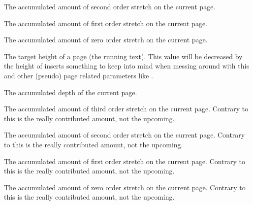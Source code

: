 The accumulated amount of second order stretch on the current page.

\stopoldprimitive

\startoldprimitive[title={\prm {pagefilstretch}}]

The accumulated amount of first order stretch on the current page.

\stopoldprimitive

\startnewprimitive[title={\prm {pagefistretch}}]

The accumulated amount of zero order stretch on the current page.

\stopnewprimitive

\startoldprimitive[title={\prm {pagegoal}}]

The target height of a page (the running text). This value will be decreased by
the height of inserts something to keep into mind when messing around with this
and other (pseudo) page related parameters like .

\stopoldprimitive

\startnewprimitive[title={\prm {pagelastdepth}}]

The accumulated depth of the current page.

\stopnewprimitive

\startnewprimitive[title={\prm {pagelastfilllstretch}}]

The accumulated amount of third order stretch on the current page. Contrary to
 this is the really contributed amount, not the upcoming.

\stopnewprimitive

\startnewprimitive[title={\prm {pagelastfillstretch}}]

The accumulated amount of second order stretch on the current page. Contrary to
 this is the really contributed amount, not the upcoming.

\stopnewprimitive

\startnewprimitive[title={\prm {pagelastfilstretch}}]

The accumulated amount of first order stretch on the current page. Contrary to
 this is the really contributed amount, not the upcoming.

\stopnewprimitive

\startnewprimitive[title={\prm {pagelastfistretch}}]

The accumulated amount of zero order stretch on the current page. Contrary to
 this is the really contributed amount, not the upcoming.

